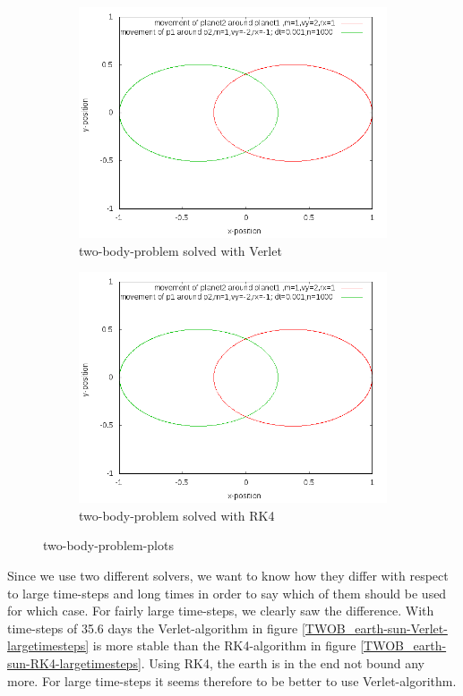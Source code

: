 \documentclass[10pt,a4paper]{article}
\begin{document}
\begin{figure}[h]
\begin{subfigure}{0.45\textwidth}
\centering
	\includegraphics[width=\textwidth]{Verletposition_two_planets.png}
	\caption{two-body-problem solved with Verlet\label{TWOB_Verlet_example}}
\end{subfigure}
\begin{subfigure}{0.45\textwidth}
\centering
	\includegraphics[width=\textwidth]{Rungekuttaposition_with_lines.png}
	\caption{two-body-problem solved with RK4 \label{TWOB_RK4_example}}
\end{subfigure}
\caption{two-body-problem-plots}
\end{figure} 

Since we use two different solvers, we want to know how they differ with respect to large time-steps and long times in order to say which of them should be used for which case. For fairly large time-steps, we clearly saw the difference. With time-steps of 35.6 days the Verlet-algorithm in figure \ref{TWOB_earth-sun-Verlet-largetimesteps} is more stable than the RK4-algorithm in figure \ref{TWOB_earth-sun-RK4-largetimesteps}. Using RK4, the earth is in the end not bound any more. For large time-steps it seems therefore to be better to use Verlet-algorithm. 
\end{document}

